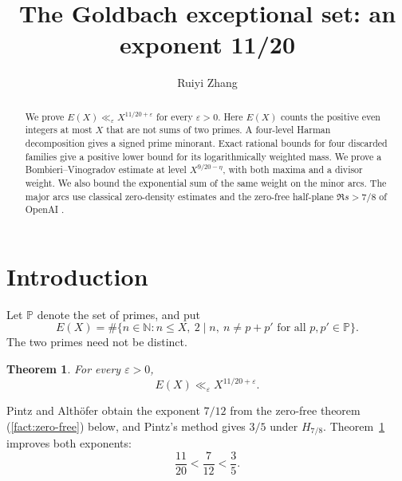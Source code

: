 \documentclass{amsart}
\newtheorem{theorem}{Theorem}
\newcounter{fact}
\numberwithin{equation}{section}
\numberwithin{table}{section}
\newcommand{\N}{\mathbb N}
\newcommand{\PP}{\mathbb P}
\begin{document}
\title{The Goldbach exceptional set: an exponent 11/20}
\author{Ruiyi Zhang}
\address{Independent Researcher, Columbia, Maryland, USA}

\begin{abstract}
We prove $E(X)\ll_\varepsilon X^{11/20+\varepsilon}$ for every
$\varepsilon>0$. Here $E(X)$ counts the positive even integers at most $X$
that are not sums of two primes. A four-level Harman decomposition gives
a signed prime minorant. Exact rational bounds for four discarded families
give a positive lower bound for its logarithmically weighted mass.
We prove a Bombieri--Vinogradov estimate at level $X^{9/20-\eta}$,
with both maxima and a divisor weight. We also bound the exponential sum
of the same weight on the minor arcs. The major arcs use classical
zero-density estimates and the zero-free half-plane $\Re s>7/8$ of
OpenAI \cite[Theorem~1.1]{OA}.
\end{abstract}

\maketitle

\section{Introduction}\label{sec:introduction}

Let $\PP$ denote the set of primes, and put
\begin{equation}\label{eq:exceptional-set}
E(X)=\#\{n\in\N:n\le X,\ 2\mid n,\ n\ne p+p'
\text{ for all }p,p'\in\PP\}.
\end{equation}
The two primes need not be distinct.

\begin{theorem}\label{thm:main}
For every $\varepsilon>0$,
\begin{equation}
E(X)\ll_\varepsilon X^{11/20+\varepsilon}.
\end{equation}
\end{theorem}

Pintz and Alth\"ofer obtain the exponent $7/12$ from the zero-free
theorem (\ref{fact:zero-free}) below, and Pintz's method gives $3/5$ under
$H_{7/8}$. Theorem~\ref{thm:main} improves both exponents:
\[
\frac{11}{20}<\frac7{12}<\frac35.
\]
\end{document}
